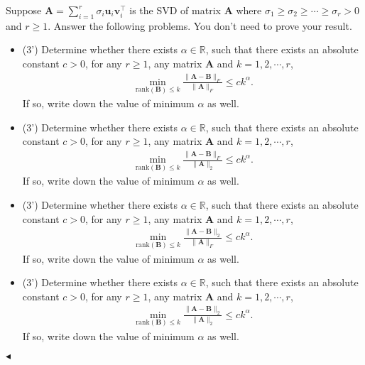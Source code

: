 \documentclass[11pt]{article}
\newenvironment{problem}[2][Problem]{\begin{trivlist}
\item[\hskip \labelsep {\bfseries #1}\hskip \labelsep {\bfseries #2.}]}{\hfill$\blacktriangleleft$\end{trivlist}}
\begin{document}
\begin{problem}{2 (12')} Suppose $\bm A=\sum_{i=1}^r \sigma_i \bm u_i \bm v_i^\top$ is the SVD of matrix $\bm A$ where $\sigma_1\geq\sigma_2\geq\cdots\geq\sigma_r>0$ and $r\geq 1$. Answer the following problems. You don't need to prove your result.
    \begin{itemize}
        \item [(1)] (3') Determine whether there exists $\alpha\in\mathbb{R}$, such that there exists an absolute constant $c>0$, for any $r\geq 1$, any matrix $\bm A$ and $k=1,2,\cdots,r$,
        \begin{align*}
            \min_{\mathrm{rank}(\bm B)\leq k}\frac{\|\bm A-\bm B\|_F}{\|\bm A\|_F}\leq ck^\alpha.
        \end{align*}
        If so, write down the value of minimum $\alpha$ as well.
        \item [(2)] (3') Determine whether there exists $\alpha\in\mathbb{R}$, such that there exists an absolute constant $c>0$, for any $r\geq 1$, any matrix $\bm A$ and $k=1,2,\cdots,r$,
        \begin{align*}
            \min_{\mathrm{rank}(\bm B)\leq k}\frac{\|\bm A-\bm B\|_F}{\|\bm A\|_2}\leq ck^\alpha.
        \end{align*}
        If so, write down the value of minimum $\alpha$ as well.
        \item [(3)] (3') Determine whether there exists $\alpha\in\mathbb{R}$, such that there exists an absolute constant $c>0$, for any $r\geq 1$, any matrix $\bm A$ and $k=1,2,\cdots,r$,
        \begin{align*}
            \min_{\mathrm{rank}(\bm B)\leq k}\frac{\|\bm A-\bm B\|_2}{\|\bm A\|_F}\leq ck^\alpha.
        \end{align*}
        If so, write down the value of minimum $\alpha$ as well.
        \item [(4)] (3') Determine whether there exists $\alpha\in\mathbb{R}$, such that there exists an absolute constant $c>0$, for any $r\geq 1$, any matrix $\bm A$ and $k=1,2,\cdots,r$,
        \begin{align*}
            \min_{\mathrm{rank}(\bm B)\leq k}\frac{\|\bm A-\bm B\|_2}{\|\bm A\|_2}\leq ck^\alpha.
        \end{align*}
        If so, write down the value of minimum $\alpha$ as well.
    \end{itemize}
\end{problem}
\end{document}
